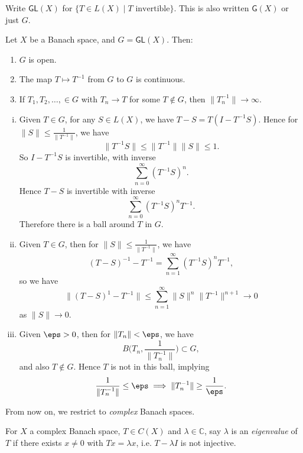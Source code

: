 \documentclass[12pt]{article}
\begin{document}
Write $\mathsf{GL}(X)$ for $\{ T \in L(X) \mid T \text{ invertible}\}$. This is also written $\mathsf{G}(X)$ or just $G$.

\begin{theorem}
	Let $X$ be a Banach space, and $G = \mathsf{GL}(X)$. Then:
	\begin{enumerate}[\normalfont(i)]
		\item $G$ is open.
		\item The map $T \mapsto T^{-1}$ from $G$ to $G$ is continuous.
		\item If $T_1, T_2, \ldots, \in G$ with $T_n \to T$ for some $T \not\in G$, then $\|T_n^{-1}\| \to \infty$.
	\end{enumerate}
	
\end{theorem}


\begin{proofbox}


\begin{enumerate}[(i)]
	\item Given $T \in G$, for any $S \in L(X)$, we have $T - S = T(I - T^{-1}S)$. Hence for $\|S\| \leq \frac{1}{\|T^{-1}\|}$, we have
		\[
		\|T^{-1}S\| \leq \|T^{-1}\|\|S\| \leq 1.
		\]
		So $I - T^{-1}S$ is invertible, with inverse
		\[
		\sum_{n = 0}^{\infty}(T^{-1}S)^{n}.
		\]
		Hence $T - S$ is invertible with inverse
		\[
		\sum_{n = 0}^{\infty}(T^{-1}S)^{n} T^{-1}.
		\]
		Therefore there is a ball around $T$ in $G$.
	\item Given $T \in G$, then for $\|S\| \leq \frac{1}{\|T^{-1}\|}$, we have
		\[
			(T-S)^{-1} - T^{-1} = \sum_{n = 1}^{\infty}(T^{-1}S)^{n} T^{-1},
		\]
		so we have
		\[
		\|(T-S)^{1} - T^{-1}\| \leq \sum_{n = 1}^{\infty} \|S\|^{n} \|T^{-1}\|^{n+1} \to 0
		\]
		as $\|S\| \to 0$.
	\item Given $\eps > 0$, then for $\|T_n\| < \eps$, we have
		\[
		B\biggl(T_n, \frac{1}{\|T_n^{-1}\|} \biggr) \subset G,
		\]
		and also $T \not \in G$. Hence $T$ is not in this ball, implying
		\[
		\frac{1}{\|T_n^{-1}\|} \leq \eps \implies \|T_n^{-1}\| \geq \frac{1}{\eps}.
		\]
\end{enumerate}
\end{proofbox}

From now on, we restrict to \emph{complex} Banach spaces.

For $X$ a complex Banach space, $T \in C(X)$ and $\lambda \in \mathbb{C}$, say $\lambda$ is an \emph{eigenvalue} of $T$ if there exists $x \neq 0$ with $Tx = \lambda x$, i.e. $T - \lambda I$ is not injective.
\end{document}
